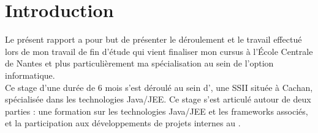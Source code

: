 \chapter*{Introduction}

Le présent rapport a pour but de présenter le déroulement et le travail effectué lors de mon travail de fin d'étude qui vient finaliser mon cursus à l'\'{E}cole Centrale de Nantes et plus particulièrement ma spécialisation au sein de l'option informatique.\\

Ce stage d'une durée de 6 mois s'est déroulé au sein d'\ebi{}, une SSII située à Cachan, spécialisée dans les technologies Java/JEE. Ce stage s'est articulé autour de deux parties : une formation sur les technologies Java/JEE et les frameworks associés, et la participation aux développements de projets internes au \excilysGroup{}.
